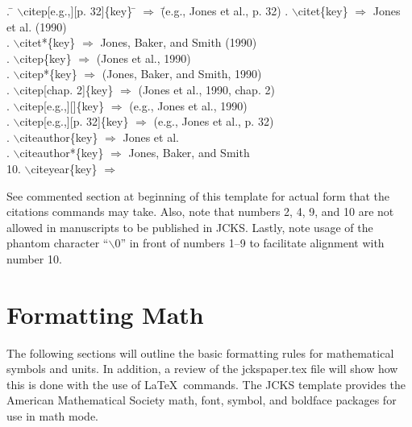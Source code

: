 \documentclass[12pt]{article}
\begin{document}
\begin{tabbing}
. \= $\backslash$citep[e.g.,][p. 32]\{key\} \= $\Rightarrow$ \= (e.g., Jones et al., p. 32) \kill
{}. \> $\backslash$citet\{key\}               \> $\Rightarrow$ \> Jones et al. (1990) \\
. \> $\backslash$citet*\{key\}              \> $\Rightarrow$ \> Jones, Baker, and Smith (1990) \\
. \> $\backslash$citep\{key\}               \> $\Rightarrow$ \> (Jones et al., 1990) \\
. \> $\backslash$citep*\{key\}              \> $\Rightarrow$ \> (Jones, Baker, and Smith, 1990) \\
. \> $\backslash$citep[chap. 2]\{key\}      \> $\Rightarrow$ \> (Jones et al., 1990, chap. 2) \\
. \> $\backslash$citep[e.g.,][]\{key\}      \> $\Rightarrow$ \> (e.g., Jones et al., 1990) \\
. \> $\backslash$citep[e.g.,][p. 32]\{key\} \> $\Rightarrow$ \> (e.g., Jones et al., p. 32) \\
. \> $\backslash$citeauthor\{key\}          \> $\Rightarrow$ \> Jones et al. \\
. \> $\backslash$citeauthor*\{key\}         \> $\Rightarrow$ \> Jones, Baker, and Smith \\
 10. \> $\backslash$citeyear\{key\}            \> $\Rightarrow$  \\
\end{tabbing}
See commented section at beginning of this template for actual form that the citations commands may take.  Also, note that numbers 2, 4, 9, and 10 are not allowed in manuscripts to be published in JCKS.  Lastly, note usage of the phantom character ``$\backslash 0$'' in front of numbers 1--9 to facilitate alignment with number 10.

\section{Formatting Math}
The following sections will outline the basic formatting rules for mathematical symbols and units.  In addition, a review of the jckspaper.tex file will show how this is done with the use of \LaTeX\ commands.  The JCKS template provides the American Mathematical Society math, font, symbol, and boldface packages for use in math mode.
\end{document}
